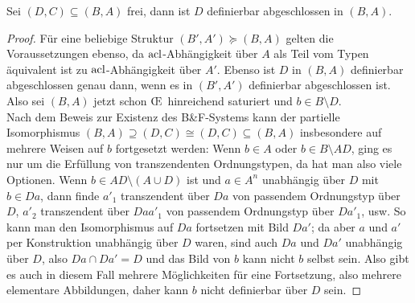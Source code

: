 \begin{lemma}\label{Freie Definierbarkeit}
	Sei $(D,C)\subseteq(B,A)$ frei, dann ist $D$ definierbar abgeschlossen in $(B,A)$.
\end{lemma}
\begin{proof}
	Für eine beliebige Struktur $(B',A')\succeq (B,A)$ gelten die Voraussetzungen ebenso, da $\operatorname{acl}$-Abhängigkeit über $A$ als Teil vom Typen äquivalent ist zu $\operatorname{acl}$-Abhängigkeit über $A'$. Ebenso ist $D$ in $(B,A)$ definierbar abgeschlossen genau dann, wenn es in $(B',A')$ definierbar abgeschlossen ist. Also sei $(B,A)$ jetzt schon \OE\ hinreichend saturiert und $b\in B\setminus D$.\\
	Nach dem Beweis zur Existenz des B\&F-Systems kann der partielle Isomorphismus $(B,A)\supseteq(D,C)\cong(D,C)\subseteq(B,A)$ insbesondere auf mehrere Weisen auf $b$ fortgesetzt werden: Wenn $b\in A$ oder $b\in B\setminus AD$, ging es nur um die Erfüllung von transzendenten Ordnungstypen, da hat man also viele Optionen. Wenn $b\in AD\setminus(A\cup D)$ ist und $a\in A^n$ unabhängig über $D$ mit $b\in Da$, dann finde $a'_1$ transzendent über $Da$ von passendem Ordnungstyp über $D$, $a'_2$ transzendent über $Daa'_1$ von passendem Ordnungstyp über $Da'_1$, usw. So kann man den Isomorphismus auf $Da$ fortsetzen mit Bild $Da'$; da aber $a$ und $a'$ per Konstruktion unabhängig über $D$ waren, sind auch $Da$ und $Da'$ unabhängig über $D$, also $Da\cap Da'=D$ und das Bild von $b$ kann nicht $b$ selbst sein. Also gibt es auch in diesem Fall mehrere Möglichkeiten für eine Fortsetzung, also mehrere elementare Abbildungen, daher kann $b$ nicht definierbar über $D$ sein.
\end{proof}

